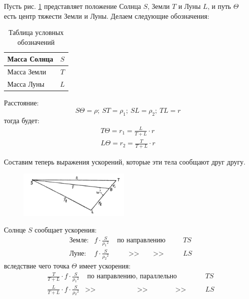 \documentclass[a4paper,12pt]{book}
\begin{document}
Пусть рис. \ref{fig:noname_1} представляет положение Солнца $S$, Земли $T$ и Луны $L$, и путь $\Theta$ есть центр тяжести Земли и Луны. Делаем следующие обозначения:

\begin{table}[ht] %
	\centering
	\begin{tabular}{|l|c|}
		\hline
		Масса Солнца & $S$ \\
		\hline
		Масса Земли & $T$ \\
		\hline
		Масса Луны & $L$ \\
		\hline
	\end{tabular}
	\caption{Таблица условных обозначений}
	\label{tbl:1}
\end{table}

Расстояние:
\[ S\Theta=\rho;\ ST=\rho_1;\ SL=\rho_2;\ TL=r\]
тогда будет:
%
\begin{equation}
	\begin{aligned}
		T\Theta=r_1=\frac{L}{T+L}\cdot r \\
		L\Theta=r_2=\frac{T}{T+L}\cdot r
	\end{aligned}
	\label{eq:1}
\end{equation}

Составим теперь выражения ускорений, которые эти тела сообщают друг другу.

\begin{figure}
	\vspace{-20pt}
	\begin{center}
		\includegraphics[width=0.48\textwidth]{21.png}
	\end{center}
	\vspace{-20pt}
	\caption{}
	\label{fig:noname_1}
	\vspace{-20pt}
\end{figure}

Солнце $S$ сообщает ускорения:
%
\begin{equation*}
\begin{aligned}
	& \text{Земле:} & f\cdot\frac{S}{\rho{_1}^2} & \text{ по направлению } & TS
	\\
	& \text{Луне:} & f\cdot\frac{S}{\rho{_2}^2} & \qquad \text{>>} \qquad \text{>>} \qquad & LS
\end{aligned}
\end{equation*}
%
вследствие чего точка $\Theta$ имеет ускорения:
%
\begin{equation*}
\begin{aligned}
	& \frac{T}{T+L} \cdot f \cdot \frac{S}{\rho{_1}^2} & \text{ по направлению, параллельно } & TS
	\\
	&  \frac{L}{T+L} \cdot f \cdot \frac{S}{\rho{_2}^2} & \text{>>} \qquad\qquad\qquad\text{>>} \qquad\qquad \text{>>} \qquad & LS
\end{aligned}
\end{equation*}
\end{document}
